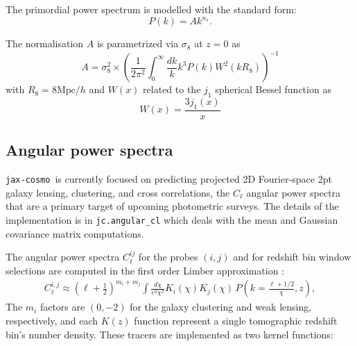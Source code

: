 \documentclass[twocolumn,twocolappendix,nofootinbib,iop]{openjournal}
\newcommand{\JZ}[1]{{\color{purple}JZ: #1}}
\newcommand{\jaxcosmo}{\texttt{jax-cosmo}}
\begin{document}
The primordial power spectrum is modelled with the standard form:
\begin{equation}
    P(k) = A k^{n_s}.
\end{equation}

The normalisation $A$ is parametrized via $\sigma_8$ at $z=0$ as 
\begin{equation}
    A = \sigma_8^2 \times \left(\frac{1}{2 \pi^2} \int_0^\infty \frac{dk}{k} k^3 P(k) W^2(kR_8) \right)^{-1}
\end{equation}
with $R_8 = 8 \mathrm{Mpc}/h$ and $W(x)$ related to the $j_1$ spherical Bessel function as
\begin{equation}
    W(x) = \frac{3j_1(x)}{x}
\end{equation}

%
\subsection{Angular power spectra}
%
\jaxcosmo\ is currently focused on predicting projected 2D Fourier-space 2pt galaxy lensing, clustering, and cross correlations, the $C_\ell$ angular power spectra that are a primary target of upcoming photometric surveys. The details of the implementation is in \texttt{jc.angular\_cl} which deals with the mean and Gaussian covariance matrix computations.

The angular power spectra $C_\ell^{ij}$ for the probes $(i,j)$ and for redshift bin window selections are computed in the first order Limber approximation \citep{PhysRevD.78.123506}:
\begin{align}
    C_\ell^{i,j} \approx \left(\ell+\frac{1}{2}\right)^{m_i+m_j}\int\frac{d\chi}{c^2\chi^2}K_i(\chi)K_j(\chi)\,P\left(k=\frac{\ell+1/2}{\chi},z\right),\label{eq:Cell_limber}
\end{align}
The $m_i$ factors are $(0,-2)$ for the galaxy clustering and weak lensing, respectively, and each $K(z)$ function represent a single tomographic redshift bin's number density. These tracers are implemented as two kernel functions:
\end{document}
